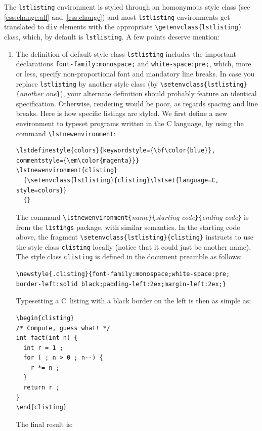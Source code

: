 The \texttt{lstlisting} environment is styled through
an homonymous style class (see \ref{css:change:all} and~\ref{css:change}) and
most \texttt{lstlisting} environments get translated to \verb+div+
elements with the appropriate \verb+\getenvclass{lstlisting}+ class, 
which, by default is \texttt{lstlisting}.
A few points deserve mention:
\begin{enumerate}
\item The definition of default style class \texttt{lstlisting} includes
the important declarations
\verb+font-family:monospace;+ and \verb+white-space:pre;+, which, more or less,
specify non-proportional font and mandatory line breaks.
In case you replace \texttt{lstlisting} by another style class (by
\verb+\setenvclass{lstlisting}{+\textit{another one}\verb+}+), your
alternate definition should probably feature an identical
specification. Otherwise, rendering would be poor, as regards spacing
and line breaks.
\ifhevea
Here is how specific listings are styled.
We first define a new environment to typeset programs written in the C
language, by using the command \verb+\lstnewenvironment+:
\begin{verbatim}
\lstdefinestyle{colors}{keywordstyle={\bf\color{blue}}, commentstyle={\em\color{magenta}}}
\lstnewenvironment{clisting}
  {\setenvclass{lstlisting}{clisting}\lstset{language=C, style=colors}}
  {}
\end{verbatim}
The command
\verb+\lstnewenvironment{+\textit{name}\verb+}{+\textit{starting
code}\verb+}{+\textit{ending code}\verb+}+ is from the
\texttt{listings} package, with similar semantics.
In the starting code above, the fragment
\verb+\setenvclass{lstlisting}{clisting}+ instructs \hevea{} to
use the style class \texttt{clisting} locally (notice that it could just
be another name). The style class \texttt{clisting} is defined in
the document preamble as follows:
\begin{verbatim}
\newstyle{.clisting}{font-family:monospace;white-space:pre;
border-left:solid black;padding-left:2ex;margin-left:2ex;}
\end{verbatim}
Typesetting a C~listing with a black border on the left is then as
simple as:
\begin{verbatim}
\begin{clisting}
/* Compute, guess what! */
int fact(int n) {
  int r = 1 ;
  for ( ; n > 0 ; n--) {
    r *= n ;
  }
  return r ;
}
\end{clisting}
\end{verbatim}
The final result is:
\begingroup%
\end{enumerate}
